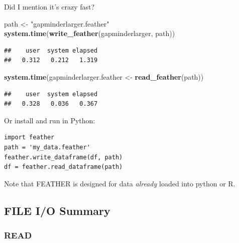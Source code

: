 \documentclass[]{article}
\newenvironment{Shaded}{\begin{snugshade}}{\end{snugshade}}
\newcommand{\KeywordTok}[1]{\textcolor[rgb]{0.13,0.29,0.53}{\textbf{{#1}}}}
\newcommand{\StringTok}[1]{\textcolor[rgb]{0.31,0.60,0.02}{{#1}}}
\newcommand{\NormalTok}[1]{{#1}}
\begin{document}
Did I mention it's crazy fast?

\begin{Shaded}
\begin{Highlighting}[]
\NormalTok{path <-}\StringTok{ "gapminderlarger.feather"}
\KeywordTok{system.time}\NormalTok{(}\KeywordTok{write_feather}\NormalTok{(gapminderlarger, path))}
\end{Highlighting}
\end{Shaded}

\begin{verbatim}
##    user  system elapsed 
##   0.312   0.212   1.319
\end{verbatim}

\begin{Shaded}
\begin{Highlighting}[]
\KeywordTok{system.time}\NormalTok{(gapminderlarger.feather <-}\StringTok{ }\KeywordTok{read_feather}\NormalTok{(path))}
\end{Highlighting}
\end{Shaded}

\begin{verbatim}
##    user  system elapsed 
##   0.328   0.036   0.367
\end{verbatim}

Or install and run in Python:

\begin{verbatim}
import feather
path = 'my_data.feather'
feather.write_dataframe(df, path)
df = feather.read_dataframe(path)
\end{verbatim}

Note that FEATHER is designed for data \emph{already} loaded into python
or R.

\subsection{FILE I/O Summary}\label{file-io-summary}

\subsubsection{READ}\label{read}
\end{document}
